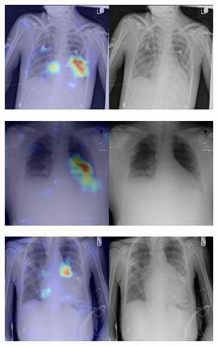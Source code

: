 \begin{figure}[b]
\begin{subfigure}{0.4\textwidth}
    \end{subfigure}
    \begin{subfigure}{0.4\textwidth}
        \centering
        \includegraphics[width=1.0\textwidth]{Chapters/5. Conclusiones/img/Cardiomegaly/1_0_00001582_008.png}
    \end{subfigure}
    \begin{subfigure}{0.4\textwidth}
        \centering
        \includegraphics[width=1.0\textwidth]{Chapters/5. Conclusiones/img/Cardiomegaly/1_0_00002059_002.png}
    \end{subfigure}
    \begin{subfigure}{0.4\textwidth}
        \centering
        \includegraphics[width=1.0\textwidth]{Chapters/5. Conclusiones/img/Cardiomegaly/1_0_00004344_039.png}

\end{subfigure}
\end{figure}
